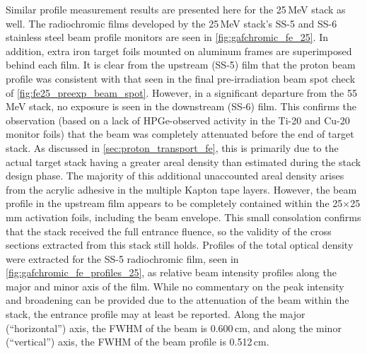 Similar profile measurement results are presented here for the 25\,MeV stack as well.
The radiochromic films developed by the 25\,MeV stack's SS-5 and SS-6 stainless steel beam profile monitors are seen in \autoref{fig:gafchromic_fe_25}.
In addition, extra iron target foils mounted on  aluminum frames are superimposed behind each film.
It is clear from the upstream (SS-5) film that the proton beam profile was consistent with that seen in the final pre-irradiation beam spot check of  \autoref{fig:fe25_preexp_beam_spot}.
However, in a significant departure from the 55\,MeV stack, no exposure is seen in the  downstream (SS-6) film.
This confirms the observation (based on a lack of HPGe-observed activity in the Ti-20 and Cu-20 monitor foils) that the beam was completely attenuated before the end of target stack.
As discussed in \autoref{sec:proton_transport_fe}, this is primarily due to the actual target stack having a greater areal density than estimated during the stack design phase.
The majority of this additional unaccounted areal density arises from the acrylic adhesive in the multiple Kapton tape layers.  
However,  the beam profile in the upstream film appears to be completely contained within the 25$\times$25\,mm activation foils, including the beam envelope.
This small consolation confirms that the stack received the full entrance fluence, so the validity of the cross sections extracted from this stack still holds.
Profiles of the total optical density were extracted for  the SS-5 radiochromic film,  seen in \autoref{fig:gafchromic_fe_profiles_25}, as relative beam intensity profiles along the major and minor axis of the film.
While no commentary on the peak intensity and broadening can be provided due to the attenuation of the beam within the stack, the entrance profile may at least be reported.
Along the major (\enquote{horizontal}) axis, the FWHM of the beam is 0.600\,cm, and along the minor (\enquote{vertical}) axis, the FWHM of the beam profile is 0.512\,cm.







